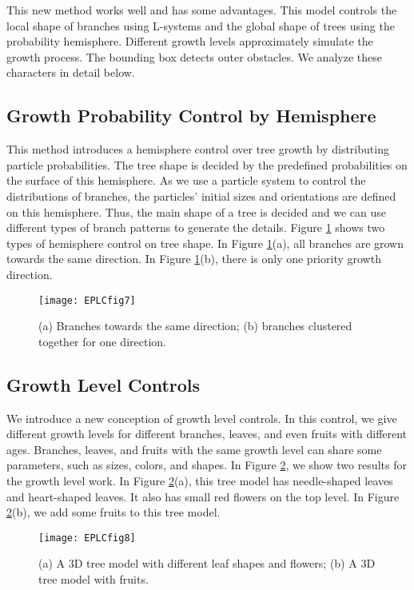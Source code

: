 This new method works well and has some advantages. This model controls the local shape of branches using L-systems and the global shape of trees using the probability hemisphere. Different growth levels approximately simulate the growth process. The bounding box detects outer obstacles. We analyze these characters in detail below. 

\subsection{Growth Probability Control by Hemisphere}

This method introduces a hemisphere control over tree growth by distributing particle probabilities. The tree shape is decided by the predefined probabilities on the surface of this hemisphere. As we use a particle system to control the distributions of branches, the particles' initial sizes and orientations are defined on this hemisphere. Thus, the main shape of a tree is decided and we can use different types of branch patterns to generate the details.
Figure \ref{fig:EPLCfig7} shows two types of hemisphere control on tree shape. In Figure \ref{fig:EPLCfig7}(a), all branches are grown towards the same direction. In Figure \ref{fig:EPLCfig7}(b), there is only one priority growth direction.

\begin{figure}[!t]
\centering
\texttt{[image: EPLCfig7]}
\caption[Branch directions. ]{(a) Branches towards the same direction; (b) branches clustered together for one direction.}
\label{fig:EPLCfig7}
\end{figure}

\subsection{Growth Level Controls}

We introduce a new conception of growth level controls. In this control, we give different growth levels for different branches, leaves, and even fruits with different ages. Branches, leaves, and fruits with the same growth level can share some parameters, such as sizes, colors, and shapes.
In Figure \ref{fig:EPLCfig8}, we show two results for the growth level work. In Figure \ref{fig:EPLCfig8}(a), this tree model has needle-shaped leaves and heart-shaped leaves. It also has small red flowers on the top level. In Figure \ref{fig:EPLCfig8}(b), we add some fruits to this tree model.

\begin{figure}[!t]
\centering
\texttt{[image: EPLCfig8]}
\caption[3D tree models.]{(a) A 3D tree model with different leaf shapes and flowers; (b) A 3D tree model with fruits.}
\label{fig:EPLCfig8}
\end{figure}

